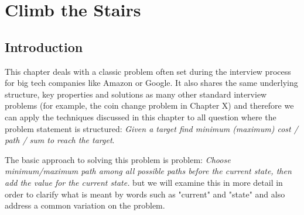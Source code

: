%

\chapter{Climb the Stairs}
\label{ch:stairs_climbing}
\section*{Introduction}
This chapter deals with a classic problem often set during the interview process for big tech companies like Amazon or Google. It also shares the same underlying structure, key properties and solutions as many other standard interview problems (for example, the coin change problem in Chapter X) and therefore we can apply the techniques discussed in this chapter to all question where the problem statement is structured: \textit{Given a target find minimum (maximum) cost / path / sum to reach the target}.  

The basic approach to solving this problem is problem: \textit{Choose minimum/maximum path among all possible paths before the current state, then add the value for the current state.} but we will examine this in more detail in order to clarify what is meant by words such as "current" and "state" and also address a common variation on the problem. 

